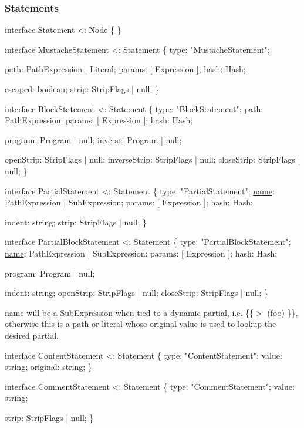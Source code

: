 \subsubsection*{Statements}


\begin{DoxyCode}
\textcolor{keyword}{interface }Statement <: Node \{ \}

\textcolor{keyword}{interface }MustacheStatement <: Statement \{
    type: \textcolor{stringliteral}{"MustacheStatement"};

    path: PathExpression | Literal;
    params: [ Expression ];
    hash: Hash;

    escaped: boolean;
    strip: StripFlags | null;
\}

\textcolor{keyword}{interface }BlockStatement <: Statement \{
    type: \textcolor{stringliteral}{"BlockStatement"};
    path: PathExpression;
    params: [ Expression ];
    hash: Hash;

    program: Program | null;
    inverse: Program | null;

    openStrip: StripFlags | null;
    inverseStrip: StripFlags | null;
    closeStrip: StripFlags | null;
\}

\textcolor{keyword}{interface }PartialStatement <: Statement \{
    type: \textcolor{stringliteral}{"PartialStatement"};
    \mbox{\hyperlink{namespacesetup_ab3a7a0638d76a01367c5bc3cc699447f}{name}}: PathExpression | SubExpression;
    params: [ Expression ];
    hash: Hash;

    indent: string;
    strip: StripFlags | null;
\}

\textcolor{keyword}{interface }PartialBlockStatement <: Statement \{
    type: \textcolor{stringliteral}{"PartialBlockStatement"};
    \mbox{\hyperlink{namespacesetup_ab3a7a0638d76a01367c5bc3cc699447f}{name}}: PathExpression | SubExpression;
    params: [ Expression ];
    hash: Hash;

    program: Program | null;

    indent: string;
    openStrip: StripFlags | null;
    closeStrip: StripFlags | null;
\}
\end{DoxyCode}


{\ttfamily name} will be a {\ttfamily Sub\+Expression} when tied to a dynamic partial, i.\+e. {\ttfamily \{\{$>$ (foo) \}\}}, otherwise this is a path or literal whose {\ttfamily original} value is used to lookup the desired partial.


\begin{DoxyCode}
\textcolor{keyword}{interface }ContentStatement <: Statement \{
    type: \textcolor{stringliteral}{"ContentStatement"};
    value: string;
    original: string;
\}

\textcolor{keyword}{interface }CommentStatement <: Statement \{
    type: \textcolor{stringliteral}{"CommentStatement"};
    value: string;

    strip: StripFlags | null;
\}
\end{DoxyCode}



